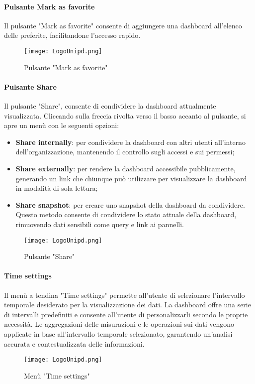 \documentclass[10pt]{article}
\begin{document}
\begin{justify}
    \paragraph{Pulsante Mark as favorite}
    Il pulsante "Mark as favorite" consente di aggiungere una dashboard all'elenco delle preferite, facilitandone l'accesso rapido.
    \begin{figure}[H]
    \centering
    \texttt{[image: LogoUnipd.png]}
    \caption{Pulsante "Mark as favorite"}
    \end{figure}

    \paragraph{Pulsante Share}
    Il pulsante "Share", consente di condividere la dashboard attualmente visualizzata. Cliccando sulla freccia rivolta verso il basso accanto al pulsante, si apre un menù con le seguenti opzioni:
    \begin{itemize}
        \item \textbf{Share internally}: per condividere la dashboard con altri utenti all'interno dell'organizzazione, mantenendo il controllo sugli accessi e sui permessi;
        \item \textbf{Share externally}: per rendere la dashboard accessibile pubblicamente, generando un link che chiunque può utilizzare per visualizzare la dashboard in modalità di sola lettura;
        \item \textbf{Share snapshot}: per creare uno snapshot della dashboard da condividere. Questo metodo consente di condividere lo stato attuale della dashboard, rimuovendo dati sensibili come query e link ai pannelli.
    \end{itemize}
    \begin{figure}[H]
    \centering
    \texttt{[image: LogoUnipd.png]}
    \caption{Pulsante "Share"}
    \end{figure}

    \paragraph{Time settings}
    Il menù a tendina "Time settings" permette all'utente di selezionare l'intervallo temporale desiderato per la visualizzazione dei dati. La dashboard offre una serie di intervalli predefiniti e consente all'utente di personalizzarli secondo le proprie necessità. Le aggregazioni delle misurazioni e le operazioni sui dati vengono applicate in base all'intervallo temporale selezionato, garantendo un'analisi accurata e contestualizzata delle informazioni.
    \begin{figure}[H]
    \centering
    \texttt{[image: LogoUnipd.png]}
    \caption{Menù "Time settings"}
    \end{figure}


\end{justify}
\end{document}
